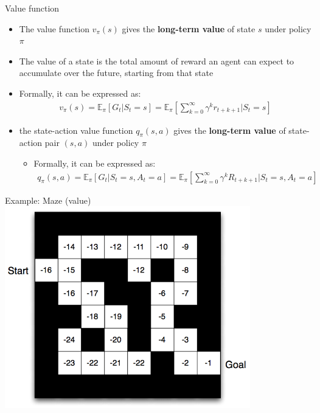 \documentclass[presentation, 9pt]{beamer}\mode<presentation>{\usetheme{AMSBolognaFC}}
\begin{document}
\begin{frame}{Value function}
\begin{itemize}
	\item The value function $v_{\pi}(s)$ gives the \textbf{long-term value} of state $s$ under policy $\pi$
	\item The value of a state is the total amount of reward an agent can expect to accumulate over the future, starting from that state
	\item Formally, it can be expressed as:
	\begin{equation*}
		\begin{split}
			v_{\pi}(s) = \mathbb{E}_{\pi} [G_t | S_t = s] = \mathbb{E}_{\pi} \left[ \sum_{k=0}^{\infty} \gamma^k r_{t+k+1} | S_t = s \right]	
		\end{split}
	\end{equation*}
	\item the state-action value function $q_{\pi}(s,a)$ gives the \textbf{long-term value} of state-action pair $(s,a)$ under policy $\pi$
	\begin{itemize}
		\item Formally, it can be expressed as:
		\begin{equation*}
			\begin{split}
				q_{\pi}(s,a) = \mathbb{E}_{\pi} [G_t | S_t = s, A_t = a] = \mathbb{E}_{\pi} \left[ \sum_{k=0}^{\infty} \gamma^k R_{t+k+1} | S_t = s, A_t = a \right]
			\end{split}
		\end{equation*}
	\end{itemize}
\end{itemize}
\end{frame}
\begin{frame}{Example: Maze (value)}
	\centering
	\includegraphics[width=0.8\textwidth]{img/value-maze.png}
\end{frame}
\end{document}
